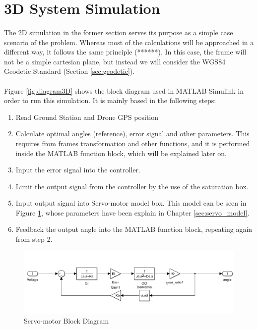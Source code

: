 \section{3D System Simulation}\label{sec:3d_sim}

\paragraph{}The 2D simulation in the former section serves its purpose as a simple case scenario of the problem. Whereas most of the calculations will be approached in a different way, it follows the same principle (******).
In this case, the frame will not be a simple cartesian plane, but instead we will consider the WGS84 Geodetic Standard (Section \ref{sec:geodetic}).


\paragraph{} Figure \ref{fig:diagram3D} shows the block diagram used in MATLAB Simulink in order to run this simulation. It is mainly based in the following steps:
\begin{enumerate}
\item{Read Ground Station and Drone GPS position}
\item{Calculate optimal angles (reference), error signal and other parameters. This requires from frames transformation and other functions, and it is performed inside the MATLAB function block, which will be explained later on.}
\item{Input the error signal into the controller.}
\item{Limit the output signal from the controller by the use of the saturation box.}
\item{Input output signal into Servo-motor model box. This model can be seen in Figure \ref{fig:servomotor3D}, whose parameters have been explain in Chapter \ref{sec:servo_model}.}
\item{Feedback the output angle into the MATLAB function block, repeating again from step 2.}
\end{enumerate}

\begin{figure}[h]
	\centering
	\includegraphics[width=1.1\textwidth]{figures/servomotor_3D.png}
	\caption{Servo-motor Block Diagram}
   	\label{fig:servomotor3D}
\end{figure}

